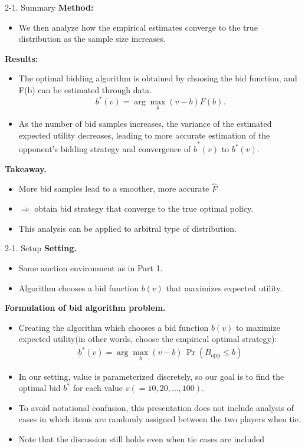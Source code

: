 \documentclass{beamer}
\begin{document}
\begin{frame}{2-1. Summary}
\small
\textbf{Method:}
\begin{itemize}
    \item We then analyze how the empirical estimates converge to the true distribution as the sample size increases.
\end{itemize}
\textbf{Results:}
\begin{itemize}
    \item The optimal bidding algorithm is obtained by choosing the bid function, and F(b) can be estimated through data.
    \[
    b^*(v) = \arg\max_{b}(v-b)F(b).
    \]
    \item As the number of bid samples increases, the variance of the estimated expected utility decreases,
    leading to more accurate estimation of the opponent’s bidding strategy and convergence of $\hat b^*(v)$ to $b^*(v)$.
\end{itemize}
\textbf{Takeaway.}\\
\begin{itemize}
    \item More bid samples lead to a smoother, more accurate $\hat F$\\
    \item $\Rightarrow$ obtain bid strategy that converge to the true optimal policy.
    \item This analysis can be applied to arbitral type of distribution.
\end{itemize}
\end{frame}

\begin{frame}{2-1. Setup}
\small
\textbf{Setting.}
\begin{itemize}
  \item Same auction environment as in Part 1.
  \item Algorithm chooses a bid function $b(v)$ that maximizes expected utility.
\end{itemize}

\vspace{1em}

\textbf{Formulation of bid algorithm problem.}\\
\begin{itemize}
    \item Creating the algorithm which chooses a bid function $b(v)$ to maximize expected utility(in other words, choose the empirical optimal strategy):
    \begin{align*}
    b^*(v) = \arg\max_b (v-b)\,\Pr(B_{\text{opp}}\le b)
    \end{align*}
    \item In our setting, value is parameterized discretely, so our goal is to find the optimal bid $b^*$ for each value $v (=10, 20, \dots, 100)$.
    \item To avoid notational confusion, this presentation does not include analysis of cases in which items are randomly assigned between the two players when tie.\\
    \item Note that the discussion still holds even when tie cases are included 
\end{itemize}
\end{frame}
\end{document}
